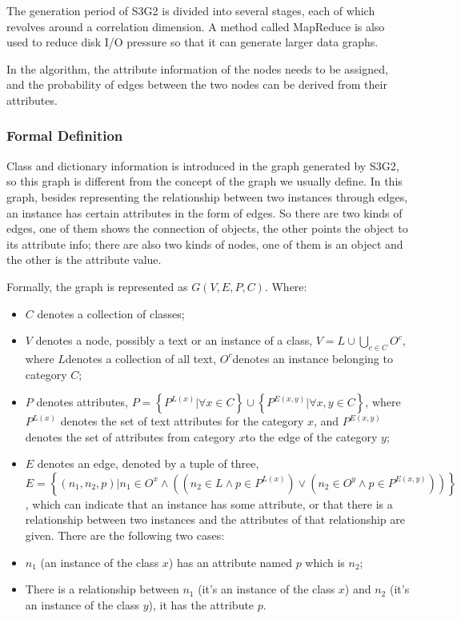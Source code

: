 \begin{survey}
The generation period of S3G2 is divided into several stages, each of
which revolves around a correlation dimension. A method called MapReduce
is also used to reduce disk I/O pressure so that it can generate larger
data graphs.

In the algorithm, the attribute information of the nodes needs to be
assigned, and the probability of edges between the two nodes can be
derived from their attributes.

\subsubsection{Formal Definition}

Class and dictionary information is introduced in the graph generated by
S3G2, so this graph is different from the concept of the graph we
usually define. In this graph, besides representing the relationship
between two instances through edges, an instance has certain attributes
in the form of edges. So there are two kinds of edges, one of them shows
the connection of objects, the other points the object to its attribute
info; there are also two kinds of nodes, one of them is an object and
the other is the attribute value.

Formally, the graph is represented as \(G(V, E, P, C)\). Where:

\begin{itemize}
\item
  \(C\) denotes a collection of classes;
\item
  \(V\) denotes a node, possibly a text or an instance of a class,
  \(V=L \cup \bigcup_{c \in C} O^{c}\), where \(L\)denotes a collection
  of all text, \(O^c\)denotes an instance belonging to category \(C\);
\item
  \(P\) denotes attributes,
  \(P=\left\{P^{L(x)} | \forall x \in C\right\} \cup\left\{P^{E(x, y)} | \forall x, y \in C\right\}\),
  where \(P^{L(x)}\) denotes the set of text attributes for the category
  \(x\), and \(P^{E(x,y)}\) denotes the set of attributes from category
  \(x\)to the edge of the category \(y\);
\item
  \(E\) denotes an edge, denoted by a tuple of three,
  \(E=\left\{\left(n_{1}, n_{2}, p\right) | n_{1} \in O^{x} \wedge\left(\left(n_{2} \in L \wedge p \in P^{L(x)}\right) \vee\left(n_{2} \in O^{y} \wedge p \in P^{E(x, y)}\right)\right)\right\}\),
  which can indicate that an instance has some attribute, or that there
  is a relationship between two instances and the attributes of that
  relationship are given. There are the following two cases:
\item
  \(n_1\) (an instance of the class \(x\)) has an attribute named \(p\)
  which is \(n_2\);
\item
  There is a relationship between \(n_1\) (it's an instance of the class
  \(x\)) and \(n_2\) (it's an instance of the class \(y\)), it has the
  attribute \(p\).
\end{itemize}


\end{survey}
